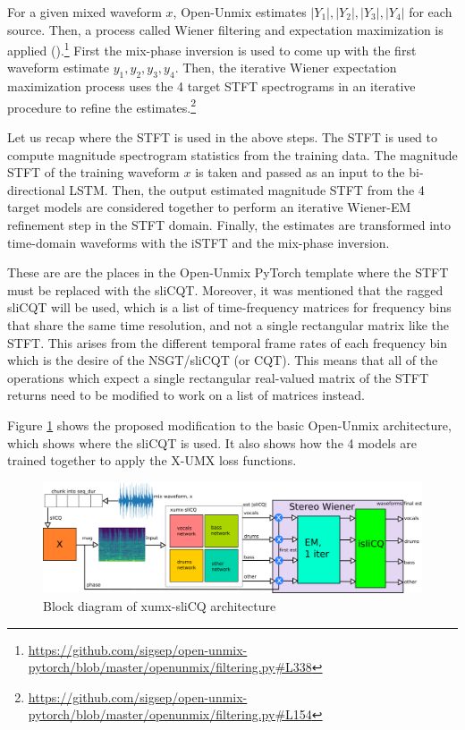 \documentclass[report.tex]{subfiles}
\begin{document}
\begin{tight_enumerate}
		For a given mixed waveform $x$, Open-Unmix estimates $|Y_{1}|, |Y_{2}|, |Y_{3}|, |Y_{4}|$ for each source. Then, a process called Wiener filtering and expectation maximization is applied (\cite{umxorig1, wiener2, wiener3, wiener4}).\footnote{\url{https://github.com/sigsep/open-unmix-pytorch/blob/master/openunmix/filtering.py\#L338}} First the mix-phase inversion is used to come up with the first waveform estimate $y_{1}, y_{2}, y_{3}, y_{4}$. Then, the iterative Wiener expectation maximization process uses the 4 target STFT spectrograms in an iterative procedure to refine the estimates.\footnote{\url{https://github.com/sigsep/open-unmix-pytorch/blob/master/openunmix/filtering.py\#L154}}
\end{tight_enumerate}

Let us recap where the STFT is used in the above steps. The STFT is used to compute magnitude spectrogram statistics from the training data. The magnitude STFT of the training waveform $x$ is taken and passed as an input to the bi-directional LSTM. Then, the output estimated magnitude STFT from the 4 target models are considered together to perform an iterative Wiener-EM refinement step in the STFT domain. Finally, the estimates are transformed into time-domain waveforms with the iSTFT and the mix-phase inversion.

These are are the places in the Open-Unmix PyTorch template where the STFT must be replaced with the sliCQT. Moreover, it was mentioned that the ragged sliCQT will be used, which is a list of time-frequency matrices for frequency bins that share the same time resolution, and not a single rectangular matrix like the STFT. This arises from the different temporal frame rates of each frequency bin which is the desire of the NSGT/sliCQT (or CQT). This means that all of the operations which expect a single rectangular real-valued matrix of the STFT returns need to be modified to work on a list of matrices instead.

Figure \ref{fig:xumxslicq} shows the proposed modification to the basic Open-Unmix architecture, which shows where the sliCQT is used. It also shows how the 4 models are trained together to apply the X-UMX loss functions.

\begin{figure}[ht]
	\centering
	\includegraphics[width=\textwidth]{./images-blockdiagrams/xumx_slicq_system_compressed.png}
	\caption{Block diagram of xumx-sliCQ architecture}
	\label{fig:xumxslicq}
\end{figure}
\end{document}
